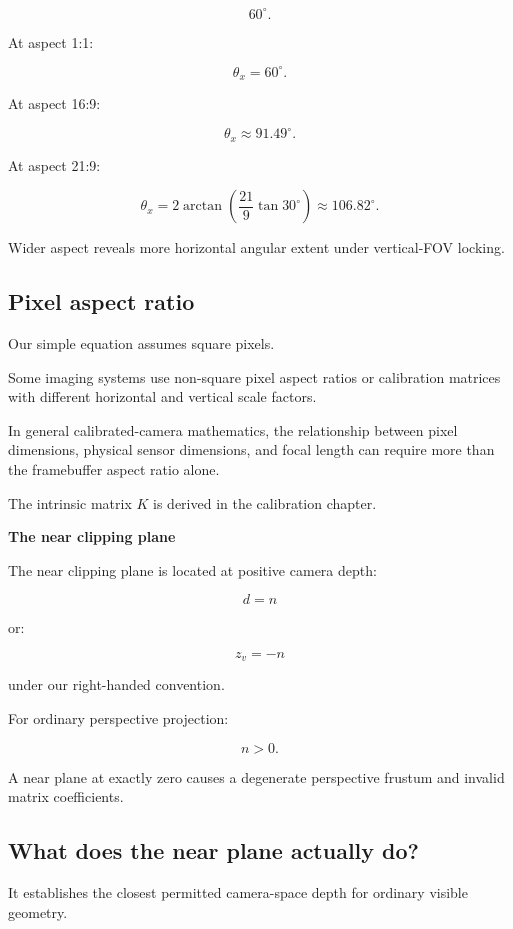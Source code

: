 \[
 60^\circ.
\]

At aspect 1:1:

\[
 \theta_x=60^\circ.
\]

At aspect 16:9:

\[
 \theta_x\approx91.49^\circ.
\]

At aspect 21:9:

\[
 \theta_x= 2\arctan\left(\frac{21}{9}\tan30^\circ\right) \approx106.82^\circ.
\]

Wider aspect reveals more horizontal angular extent under vertical-FOV locking.

\subsection{Pixel aspect ratio}\label{02-foundations-ii-ch033-pixel-aspect-ratio}

Our simple equation assumes square pixels.

Some imaging systems use non-square pixel aspect ratios or calibration matrices with different horizontal and vertical scale factors.

In general calibrated-camera mathematics, the relationship between pixel dimensions, physical sensor dimensions, and focal length can require more than the framebuffer aspect ratio alone.

The intrinsic matrix \(K\) is derived in the calibration chapter.

\textbf{The near clipping plane}

The near clipping plane is located at positive camera depth:

\[
 \boxed{d=n}
\]

or:

\[
 z_v=-n
\]

under our right-handed convention.

For ordinary perspective projection:

\[
 \boxed{n>0}.
\]

A near plane at exactly zero causes a degenerate perspective frustum and invalid matrix coefficients.

\subsection{What does the near plane actually do?}\label{02-foundations-ii-ch033-what-does-the-near-plane-actually-do}

It establishes the closest permitted camera-space depth for ordinary visible geometry.

